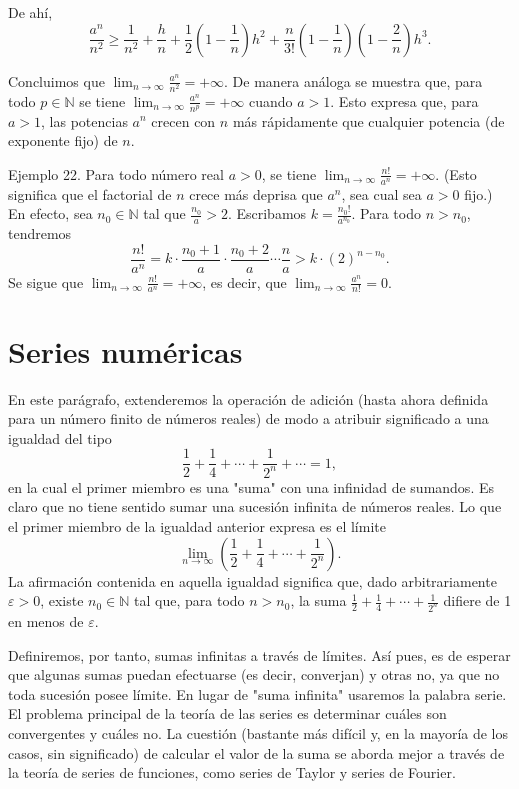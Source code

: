 \documentclass[12pt,oneside]{book}
\begin{document}
De ahí,
\[
\frac{a^n}{n^2} \geq \frac{1}{n^2} + \frac{h}{n} + \frac{1}{2} \left( 1 - \frac{1}{n} \right) h^2 + \frac{n}{3!} \left( 1 - \frac{1}{n} \right) \left( 1 - \frac{2}{n} \right) h^3.
\]

Concluimos que \(\lim_{n \to \infty} \frac{a^n}{n^2} = +\infty\). De manera análoga se muestra que, para todo \(p \in \mathbb{N}\) se tiene \(\lim_{n \to \infty} \frac{a^n}{n^p} = +\infty\) cuando \(a > 1\). Esto expresa que, para \(a > 1\), las potencias \(a^n\) crecen con \(n\) más rápidamente que cualquier potencia (de exponente fijo) de \(n\).

Ejemplo 22. Para todo número real \(a > 0\), se tiene \(\lim_{n \to \infty} \frac{n!}{a^n} = +\infty\). (Esto significa que el factorial de \(n\) crece más deprisa que \(a^n\), sea cual sea \(a > 0\) fijo.) En efecto, sea \(n_0 \in \mathbb{N}\) tal que \(\frac{n_0}{a} > 2\). Escribamos \(k = \frac{n_0!}{a^{n_0}}\). Para todo \(n > n_0\), tendremos
\[
\frac{n!}{a^n} = k \cdot \frac{n_0 + 1}{a} \cdot \frac{n_0 + 2}{a} \cdots \frac{n}{a} > k \cdot (2)^{n-n_0}.
\]
Se sigue que \(\lim_{n \to \infty} \frac{n!}{a^n} = +\infty\), es decir, que \(\lim_{n \to \infty} \frac{a^n}{n!} = 0\).

\section{Series numéricas}

En este parágrafo, extenderemos la operación de adición (hasta ahora definida para un número finito de números reales) de modo a atribuir significado a una igualdad del tipo
\[
\frac{1}{2} + \frac{1}{4} + \cdots + \frac{1}{2^n} + \cdots = 1,
\]
en la cual el primer miembro es una "suma" con una infinidad de sumandos. Es claro que no tiene sentido sumar una sucesión infinita de números reales. Lo que el primer miembro de la igualdad anterior expresa es el límite
\[
\lim_{n \to \infty} \left( \frac{1}{2} + \frac{1}{4} + \cdots + \frac{1}{2^n} \right).
\]
La afirmación contenida en aquella igualdad significa que, dado arbitrariamente \(\varepsilon > 0\), existe \(n_0 \in \mathbb{N}\) tal que, para todo \(n > n_0\), la suma \(\frac{1}{2} + \frac{1}{4} + \cdots + \frac{1}{2^n}\) difiere de 1 en menos de \(\varepsilon\).

Definiremos, por tanto, sumas infinitas a través de límites. Así pues, es de esperar que algunas sumas puedan efectuarse (es decir, converjan) y otras no, ya que no toda sucesión posee límite. En lugar de "suma infinita" usaremos la palabra serie. El problema principal de la teoría de las series es determinar cuáles son convergentes y cuáles no. La cuestión (bastante más difícil y, en la mayoría de los casos, sin significado) de calcular el valor de la suma se aborda mejor a través de la teoría de series de funciones, como series de Taylor y series de Fourier.
\end{document}
